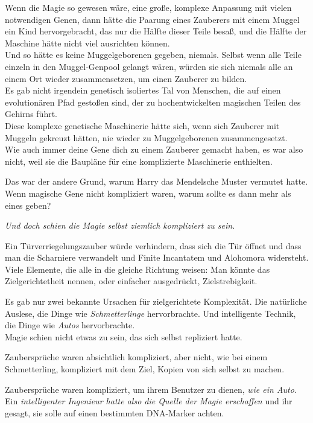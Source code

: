 {Wenn die Magie so gewesen wäre, eine große, komplexe Anpassung mit vielen notwendigen Genen, dann hätte die Paarung eines Zauberers mit einem Muggel ein Kind hervorgebracht, das nur die Hälfte dieser Teile besaß, und die Hälfte der Maschine hätte nicht viel ausrichten können.\\ Und so hätte es keine Muggelgeborenen gegeben, niemals. Selbst wenn alle Teile einzeln in den Muggel-Genpool gelangt wären, würden sie sich niemals alle an einem Ort wieder zusammensetzen, um einen Zauberer zu bilden.\\ Es gab nicht irgendein genetisch isoliertes Tal von Menschen, die auf einen evolutionären Pfad gestoßen sind, der zu hochentwickelten magischen Teilen des Gehirns führt.\\ Diese komplexe genetische Maschinerie hätte sich, wenn sich Zauberer mit Muggeln gekreuzt hätten, nie wieder zu Muggelgeborenen zusammengesetzt.\\ Wie auch immer deine Gene dich zu einem Zauberer gemacht haben, es war also nicht, weil sie die Baupläne für eine komplizierte Maschinerie enthielten.

Das war der andere Grund, warum Harry das Mendelsche Muster vermutet hatte. Wenn magische Gene nicht kompliziert waren, warum sollte es dann mehr als eines geben?

\emph{Und doch schien die Magie selbst ziemlich kompliziert zu sein.}

Ein Türverriegelungszauber würde verhindern, dass sich die Tür öffnet und dass man die Scharniere verwandelt und Finite Incantatem und Alohomora widersteht.\\ Viele Elemente, die alle in die gleiche Richtung weisen: Man könnte das Zielgerichtetheit nennen, oder einfacher ausgedrückt, Zielstrebigkeit.

Es gab nur zwei bekannte Ursachen für zielgerichtete Komplexität. Die natürliche Auslese, die Dinge wie \emph{Schmetterlinge} hervorbrachte. Und intelligente Technik, die Dinge wie \emph{Autos} hervorbrachte.\\ Magie schien nicht etwas zu sein, das sich selbst repliziert hatte.

Zaubersprüche waren absichtlich kompliziert, aber nicht, wie bei einem Schmetterling, kompliziert mit dem Ziel, Kopien von sich selbst zu machen.

Zaubersprüche waren kompliziert, um ihrem Benutzer zu dienen, \emph{wie ein Auto}. Ein \emph{intelligenter Ingenieur hatte also die Quelle der Magie erschaffen} und ihr gesagt, sie solle auf einen bestimmten DNA-Marker achten.

}
